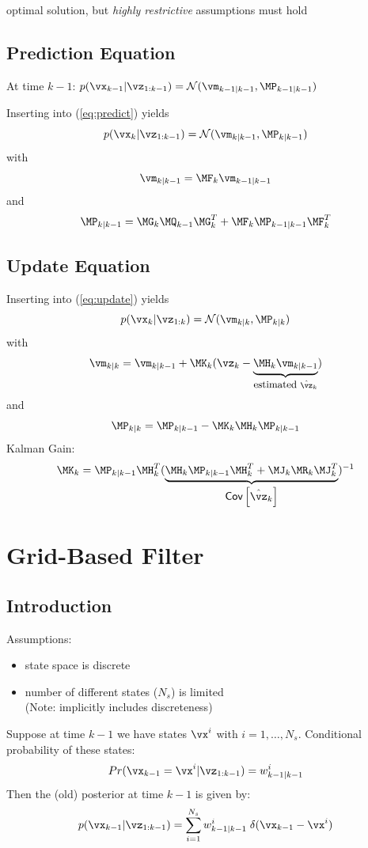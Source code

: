 \documentclass[english,pdftex]{article}
\newcommand{\Cov}[1]{\mbox{\sf Cov}\left[ #1 \right]}
\begin{document}
optimal solution, but \emph{highly restrictive} assumptions must hold


\subsection{Prediction Equation}

At time $k-1$: $p(\vx_{k-1}|\vz_{1:k-1}) = {\cal N}(\vm_{k-1|k-1}, \MP_{k-1|k-1})$

Inserting into (\ref{eq:predict}) yields
\[
  p(\vx_k|\vz_{1:k-1}) = {\cal N}(\vm_{k|k-1}, \MP_{k|k-1})
\]
with
\[
  \vm_{k|k-1} = \MF_k\vm_{k-1|k-1}
\]
and
\[
  \MP_{k|k-1} = \MG_{k}\MQ_{k-1}\MG_{k}^T + \MF_k\MP_{k-1|k-1}\MF_k^T
\]



\newpage
\subsection{Update Equation}

Inserting into (\ref{eq:update}) yields
\[
  p(\vx_k|\vz_{1:k}) = {\cal N}(\vm_{k|k}, \MP_{k|k})
\]
with
\[
  \vm_{k|k} = \vm_{k|k-1} + \MK_k (\vz_k - \underbrace{\MH_k\vm_{k|k-1}}_{\mbox{\small estimated }\hat{\vz}_k})
\]
and
\[
  \MP_{k|k} = \MP_{k|k-1} - \MK_k\MH_k\MP_{k|k-1}
\]
Kalman Gain:
\[
  \MK_k = \MP_{k|k-1}\MH_k^T(\underbrace{\MH_k\MP_{k|k-1}\MH_k^T + \MJ_k\MR_k\MJ_k^T}_{\mbox{$\Cov{\hat{\vz}_k}$}})^{-1}
\]






\section{Grid-Based Filter}


\subsection{Introduction}

Assumptions:
\begin{itemize}
  \item state space is discrete
  \item number of different states ($N_s$) is limited \\
  {\footnotesize (Note: implicitly includes discreteness)}
\end{itemize}

Suppose at time $k-1$ we have states $\vx^i$ with
$i=1,\ldots,N_s$. Conditional probability of these states:
\[
  Pr(\vx_{k-1} = \vx^i|\vz_{1:k-1}) = w_{k-1|k-1}^i
\]
Then the (old) posterior at time $k-1$ is given by:
\[
  p(\vx_{k-1}|\vz_{1:k-1}) = \sum_{i=1}^{N_s} w_{k-1|k-1}^i \; \delta(\vx_{k-1}-\vx^i)
\]
\end{document}
